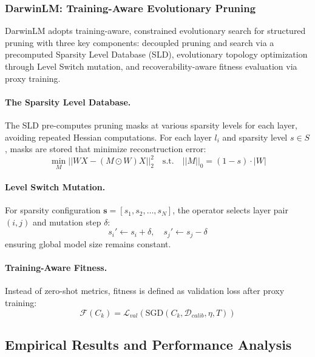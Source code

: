 \subsubsection{DarwinLM: Training-Aware Evolutionary Pruning \cite{darwinlm2025}}

DarwinLM adopts training-aware, constrained evolutionary search for structured pruning with three key components: decoupled pruning and search via a precomputed Sparsity Level Database (SLD), evolutionary topology optimization through Level Switch mutation, and recoverability-aware fitness evaluation via proxy training.

\paragraph{The Sparsity Level Database.}
The SLD pre-computes pruning masks at various sparsity levels for each layer, avoiding repeated Hessian computations. For each layer $l_i$ and sparsity level $s \in S$, masks are stored that minimize reconstruction error:
\begin{equation}
	\min_M || WX - (M \odot W)X ||_2^2 \quad \text{s.t.} \quad ||M||_0 = (1-s) \cdot |W|
\end{equation}

\paragraph{Level Switch Mutation.}
For sparsity configuration $\mathbf{s} = [s_1, s_2, \dots, s_N]$, the operator selects layer pair $(i, j)$ and mutation step $\delta$:
\begin{equation}
	s_i' \leftarrow s_i + \delta, \quad s_j' \leftarrow s_j - \delta
\end{equation}
ensuring global model size remains constant.

\paragraph{Training-Aware Fitness.}
Instead of zero-shot metrics, fitness is defined as validation loss after proxy training:
\begin{equation}
	\mathcal{F}(C_k) = \mathcal{L}_{val} \left( \text{SGD}(C_k, \mathcal{D}_{calib}, \eta, T) \right)
\end{equation}

\subsection{Empirical Results and Performance Analysis}

